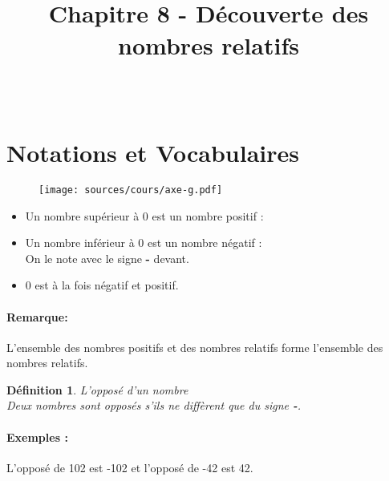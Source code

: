 \documentclass[paper=a4, fontsize=10pt]{scrartcl} %
\title{	
  \vspace{-10ex}
  \horrule{0.5pt} \\[0.4cm] %
  \huge Chapitre 8 - Découverte des nombres relatifs\\ %
  \horrule{2pt} \\[0.5cm] %
}
\author{}
\date{\vspace{-10ex}} %
\begin{document}

\newtheorem{Definition}{Définition}
\newtheorem{Theorem}{Théorème}
\newtheorem{Proposition}{Proposition}

\renewcommand{\labelitemi}{$\bullet$}
\renewcommand{\labelitemii}{$\circ$}

\maketitle %



\section{Notations et Vocabulaires}
\begin{multicols}{2}
  \begin{figure}[H]
    \centering
    \texttt{[image: sources/cours/axe-g.pdf]}
  \end{figure}

  \begin{itemize}
  \item Un nombre supérieur à 0 est un nombre positif :  
  \item Un nombre inférieur à 0 est un nombre négatif :\\
    On le note avec le signe \textbf{-} devant.
  \item 0 est à la fois négatif et positif.
  \end{itemize}

  \paragraph{Remarque: }L'ensemble des nombres positifs et des nombres relatifs forme l'ensemble des nombres relatifs.


  \begin{Definition}{L'opposé d'un nombre}\\
    Deux nombres sont opposés s'ils ne diffèrent que du signe \textbf{-}.
  \end{Definition}

  \paragraph{Exemples : }L'opposé de 102 est -102 et l'opposé de -42 est 42.
\end{multicols}
\end{document}
